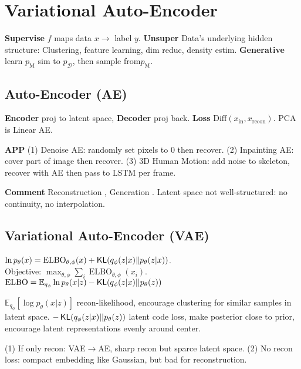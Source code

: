 \section{Variational Auto-Encoder}

\textbf{Supervise} \(f\) maps data \(x\to\) label \(y\).
\textbf{Unsuper} Data's underlying hidden structure: Clustering, feature learning, dim reduc, density estim.
\textbf{Generative} learn \(p_{\text{M}}\) sim to \(p_{\mathcal{D}}\), then sample from\(p_{\text{M}}\). 

\subsection*{Auto-Encoder (AE)}
\textbf{Encoder} proj to latent space, \textbf{Decoder} proj back. \textbf{Loss} \(\text{Diff}(x_{\text{in}}, x_{\text{recon}})\). 
PCA is Linear AE.

\textbf{APP} (1) Denoise AE: randomly set pixels to 0 then recover. (2) Inpainting AE: cover part of image then recover. (3) 3D Human Motion: add noise to skeleton, recover with AE then pass to LSTM per frame.

\textbf{Comment} Reconstruction \Checkmark, Generation \XSolidBrush. Latent space not well-structured: no continuity, no interpolation.

\subsection*{Variational Auto-Encoder (VAE)}
\begin{small}
\(\ln p_{\theta}({x}) = \operatorname{ELBO}_{\theta, \phi}({x}) + \operatorname{\mathsf{KL}}(q_{\phi}(z | {x}) \| p_{\theta}(z | {x}))\). \\
Objective: \(\max_{\theta, \phi} \sum_i \operatorname{ELBO}_{\theta, \phi}({x_i})\).\\
\( \operatorname{ELBO}= \mathbb{E}_{q_{\phi}}\ln p_{\theta}(x | z) - \operatorname{\mathsf{KL}} (q_{\phi}(z | x)|| p_{\theta}(z))\)
\end{small}


\(\mathbb{E}_{q_{\phi}}[\log p_{\theta}(x | z)]\) recon-likelihood, encourage clustering for similar samples in latent space. \(-\operatorname{\mathsf{KL}}(q_{\phi}(z | x)|| p_{\theta}(z))\) latent code loss, make posterior close to prior, encourage latent representations evenly around center.

(1) If only recon: VAE\(\to\)AE, sharp recon but sparce latent space. (2) No recon loss: compact embedding like Gaussian, but bad for reconstruction.

